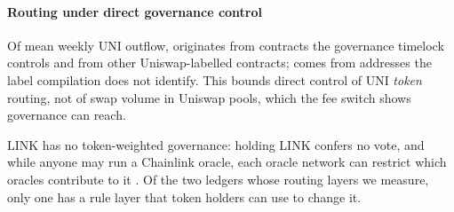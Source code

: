\paragraph{Routing under direct governance control}
Of mean weekly UNI outflow,  originates from contracts the
governance timelock controls and  from other
Uniswap-labelled contracts;  comes from addresses the label
compilation does not identify. This bounds direct control of UNI
\emph{token} routing, not of swap volume in Uniswap pools, which the fee
switch shows governance can reach.

LINK has no token-weighted governance: holding LINK confers no vote, and
while anyone may run a Chainlink oracle, each oracle network can restrict
which oracles contribute to it \cite{chainlink2022nodeoperator}. Of the two
ledgers whose routing layers we measure, only one has a rule layer that
token holders can use to change it.

